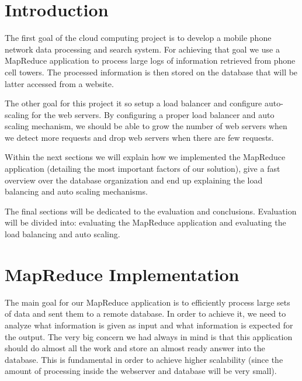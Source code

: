 \documentclass{article}
\begin{document}
\onehalfspacing %
\parskip 4pt %




\tableofcontents

\newpage

\section*{Introduction}
The first goal of the cloud computing project is to develop a mobile phone network data processing and search system. For achieving that goal we use a MapReduce application to process large logs of information retrieved from phone cell towers. The processed information is then stored on the database that will be latter accessed from a website.
 
The other goal for this project it so setup a load balancer and configure auto-scaling for the web servers. By configuring a proper load balancer and auto scaling mechanism, we should be able to grow the number of web servers when we detect more requests and drop web servers when there are few requests.

Within the next sections we will explain how we implemented the MapReduce application (detailing the most important factors of our solution), give a fast overview over the database organization and end up explaining the load balancing and auto scaling mechanisms.

The final sections will be dedicated to the evaluation and conclusions. Evaluation will be divided into: evaluating the MapReduce application and evaluating the load balancing and auto scaling.

\section{MapReduce Implementation}

The main goal for our MapReduce application is to efficiently process large sets of data and sent them to a remote database. In order to achieve it, we need to analyze what information is given as input and what information is expected for the output. The very big concern we had always in mind is that this application should do almost all the work and store an almost ready answer into the database. This is fundamental in order to achieve higher scalability (since the amount of processing inside the webserver and database will be very small).
\end{document}
